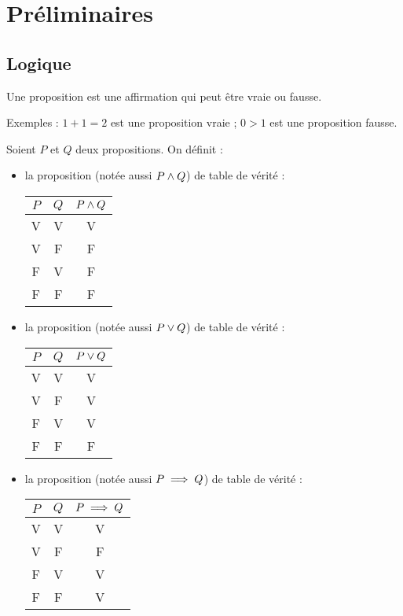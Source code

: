 \chapter{Préliminaires}

\minitoc

\section{Logique}

\begin{defi}
Une proposition est une affirmation qui peut être vraie ou fausse.

Exemples : \(1+1=2\) est une proposition vraie ; \(0>1\) est une proposition fausse.
\end{defi}

\begin{defi}
Soient \(P\) et \(Q\) deux propositions. On définit :

\begin{itemize}
\item la proposition  (notée aussi \(P\land Q\)) de table de vérité : \begin{tabular}{c|c||c}
\(P\) & \(Q\) & \(P\land Q\) \\
\hline
V & V & V \\
V & F & F \\
F & V & F \\
F & F & F
\end{tabular}

\item la proposition  (notée aussi \(P\lor Q\)) de table de vérité : \begin{tabular}{c|c||c}
\(P\) & \(Q\) & \(P\lor Q\) \\
\hline
V & V & V \\
V & F & V \\
F & V & V \\
F & F & F
\end{tabular}

\item la proposition  (notée aussi \(P\implies Q\)) de table de vérité : \begin{tabular}{c|c||c}
\(P\) & \(Q\) & \(P\implies Q\) \\
\hline
V & V & V \\
V & F & F \\
F & V & V \\
F & F & V
\end{tabular}


\end{itemize}
\end{defi}
